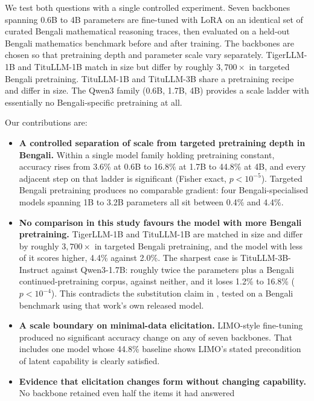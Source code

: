 We test both questions with a single controlled experiment. Seven backbones
spanning 0.6B to 4B parameters are fine-tuned with LoRA on an identical set of
curated Bengali mathematical reasoning traces, then evaluated on a held-out
Bengali mathematics benchmark before and after training. The backbones are
chosen so that pretraining depth and parameter scale vary separately.
TigerLLM-1B and TituLLM-1B match in size but differ by roughly $3{,}700\times$
in targeted Bengali pretraining. TituLLM-1B and TituLLM-3B share a pretraining
recipe and differ in size. The Qwen3 family (0.6B, 1.7B, 4B) provides a scale
ladder with essentially no Bengali-specific pretraining at all.

Our contributions are:

\begin{itemize}
  \item \textbf{A controlled separation of scale from targeted pretraining
        depth in Bengali.} Within a single model family holding pretraining
        constant, accuracy rises from 3.6\% at 0.6B to 16.8\% at 1.7B to 44.8\%
        at 4B, and every adjacent step on that ladder is significant (Fisher
        exact, $p < 10^{-5}$). Targeted Bengali pretraining produces no
        comparable gradient: four Bengali-specialised models spanning 1B to
        3.2B parameters all sit between 0.4\% and 4.4\%.
  \item \textbf{No comparison in this study favours the model with more
        Bengali pretraining.} TigerLLM-1B and TituLLM-1B are matched in size
        and differ by roughly $3{,}700\times$ in targeted Bengali pretraining,
        and the model with less of it scores higher, 4.4\% against 2.0\%. The
        sharpest case is TituLLM-3B-Instruct against Qwen3-1.7B: roughly twice
        the parameters plus a Bengali continued-pretraining corpus, against
        neither, and it loses 1.2\% to 16.8\% ($p < 10^{-4}$). This contradicts
        the substitution claim in \parencite{raihan2025tigerllm}, tested on a
        Bengali benchmark using that work's own released model.
  \item \textbf{A scale boundary on minimal-data elicitation.} LIMO-style
        fine-tuning produced no significant accuracy change on any of seven
        backbones. That includes one model whose 44.8\% baseline shows LIMO's
        stated precondition of latent capability is clearly satisfied.
  \item \textbf{Evidence that elicitation changes form without changing
        capability.} No backbone retained even half the items it had answered

\end{itemize}
